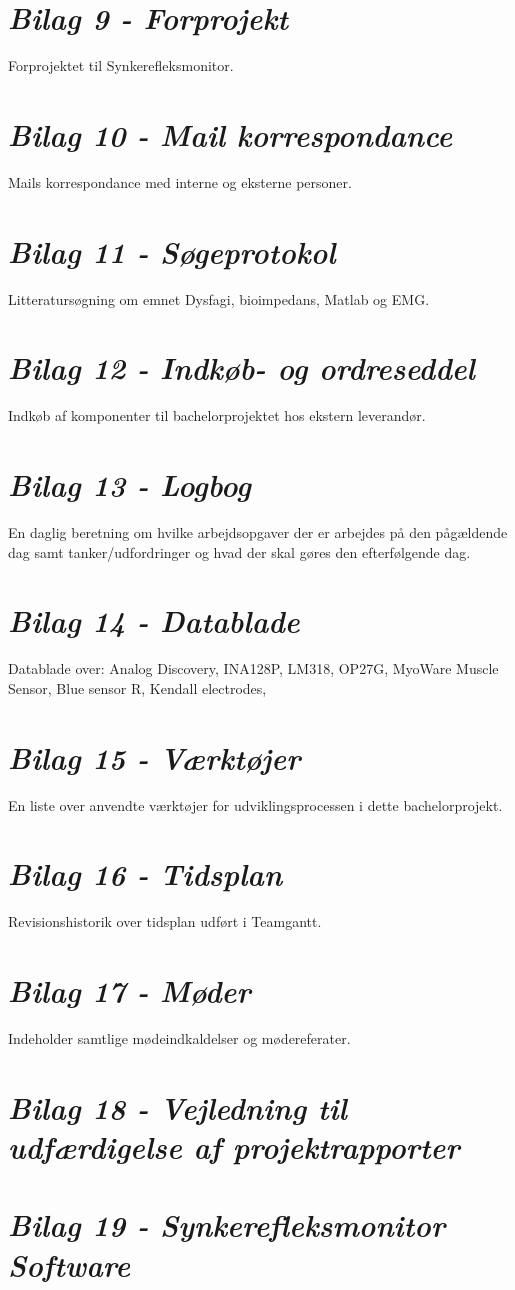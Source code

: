 \section*{\textit{Bilag 9 - Forprojekt}} \label{bilag10}
Forprojektet til Synkerefleksmonitor.
\section*{\textit{Bilag 10 - Mail korrespondance}} \label{bilag11}
Mails korrespondance med interne og eksterne personer.
\section*{\textit{Bilag 11 - Søgeprotokol}} \label{bilag12}
Litteratursøgning om emnet Dysfagi, bioimpedans, Matlab og EMG. 
\section*{\textit{Bilag 12 - Indkøb- og ordreseddel}} \label{bilag13}
Indkøb af komponenter til bachelorprojektet hos ekstern leverandør.
\section*{\textit{Bilag 13 - Logbog}} \label{bilag14}
En daglig beretning om hvilke arbejdsopgaver der er arbejdes på den pågældende dag samt tanker/udfordringer og hvad der skal gøres den efterfølgende dag.
\section*{\textit{Bilag 14 - Datablade}} \label{bilag15}
Datablade over: Analog Discovery, INA128P, LM318, OP27G, MyoWare Muscle Sensor, Blue sensor R, Kendall electrodes,
\section*{\textit{Bilag 15 - Værktøjer}} \label{bilag16}
En liste over anvendte værktøjer for udviklingsprocessen i dette bachelorprojekt.
\section*{\textit{Bilag 16 - Tidsplan}} \label{bilag17}
Revisionshistorik over tidsplan udført i Teamgantt.
\section*{\textit{Bilag 17 - Møder}} \label{bilag18}
Indeholder samtlige mødeindkaldelser og mødereferater.
\section*{\textit{Bilag 18 - Vejledning til udfærdigelse af projektrapporter}} \label{bilag19}
\section*{\textit{Bilag 19 - Synkerefleksmonitor Software}} \label{bilag20}



